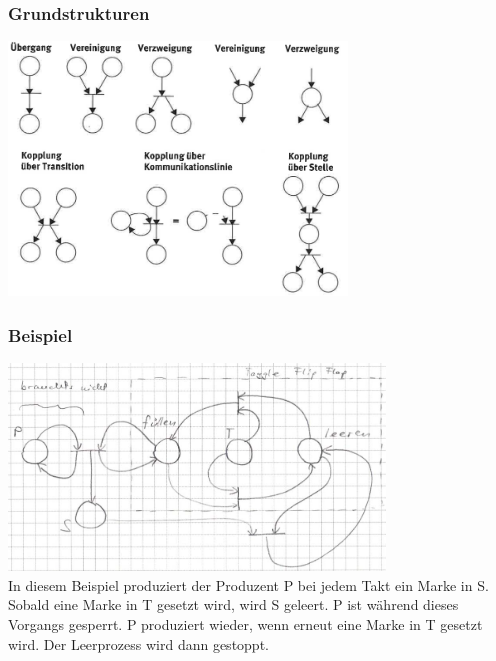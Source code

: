 \subsubsection{Grundstrukturen}
\includegraphics[width=9cm]{images/Concurrency/Petri2}

\vspace*{-1cm}
\subsubsection{Beispiel}
\includegraphics[width=10cm]{images/Concurrency/Petri3}\\
In diesem Beispiel produziert der Produzent P bei jedem Takt ein Marke in S. Sobald eine Marke in T gesetzt wird, wird S geleert. P ist während dieses Vorgangs gesperrt. P produziert wieder, wenn erneut eine Marke in T gesetzt wird. Der Leerprozess wird dann gestoppt.
